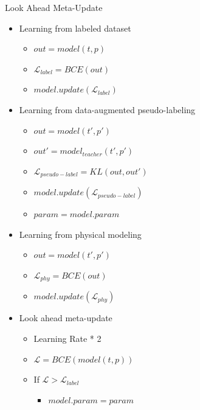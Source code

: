 \documentclass[aspectratio=1610,xcolor={dvipsnames},hyperref={colorlinks,unicode,linkcolor=violet,anchorcolor=blueviolet,citecolor=YellowOrange,filecolor=black,urlcolor=Aquamarine}]{beamer}
\begin{document}
\begin{frame}[allowframebreaks]{Look Ahead Meta-Update}
\begin{itemize}
\item Learning from labeled dataset
\begin{itemize}
\item \(out = model(t, p)\)
\item \(\mathcal{L}_{label} = BCE(out)\)
\item \(model.update(\mathcal{L}_{label})\)
\end{itemize}
\item Learning from data-augmented pseudo-labeling
\begin{itemize}
\item \(out = model(t', p')\)
\item \(out' = model_{teacher}(t', p')\)
\item \(\mathcal{L}_{pseudo-label} = KL(out, out')\)
\item \(model.update(\mathcal{L}_{pseudo-label})\)
\item \(param = model.param\)
\end{itemize}
\item Learning from physical modeling
\begin{itemize}
\item \(out = model(t', p')\)
\item \(\mathcal{L}_{phy} = BCE(out)\)
\item \(model.update(\mathcal{L}_{phy})\)
\end{itemize}
\item Look ahead meta-update
\begin{itemize}
\item Learning Rate * 2
\item \(\mathcal{L} = BCE(model(t, p))\)
\item If \(\mathcal{L} > \mathcal{L}_{label}\)
\begin{itemize}
\item \(model.param = param\)
\end{itemize}
\end{itemize}
\end{itemize}
\end{frame}
\end{document}
